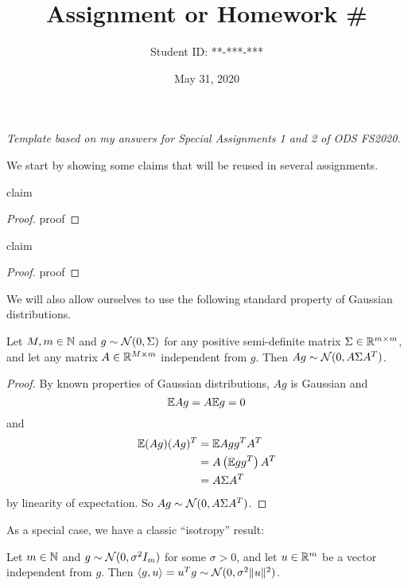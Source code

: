 \documentclass{article}
\title{Assignment or Homework \#}
\date{May 31, 2020}
\author{Student ID: **-***-***}
\numberwithin{equation}{subsection}
\begin{document}
\maketitle

\begin{center}
	\textit{Template based on my answers for Special Assignments 1 and 2 of ODS FS2020.}
\end{center}

We start by showing some claims that will be reused in several assignments.

\begin{claim} \label{claim:dummy_claim}
	claim
\end{claim}

\begin{proof}
	proof
\end{proof}

\begin{claim} 
	claim
\end{claim}

\begin{proof}
	proof
\end{proof}

We will also allow ourselves to use the following standard property of Gaussian distributions.
\begin{fact}
	Let $M, m \in \mathbb{N}$ and $g \sim \mathcal{N}(0, \Sigma)$ for any positive semi-definite matrix $\Sigma \in \mathbb{R}^{m \times m}$, and let any matrix $A \in \mathbb{R}^{M \times m}$ independent from $g$.
	Then $A g \sim \mathcal{N}(0, A \Sigma A^T)$.
\end{fact}

\begin{proof}
    By known properties of Gaussian distributions, $A g$ is Gaussian and
    \begin{equation}
        \mathbb{E} A g = A \mathbb{E} g = 0
    \end{equation}
    and
    \begin{align}
        \mathbb{E} (A g) (A g)^T &= \mathbb{E} A g g^T A^T \\
        &= A \left( \mathbb{E} g g^T \right) A^T \\
        &= A \Sigma A^T
    \end{align}
    by linearity of expectation. So $A g \sim \mathcal{N}(0, A \Sigma A^T)$.
\end{proof}

As a special case, we have a classic ``isotropy'' result:
\begin{fact}
	Let $m \in \mathbb{N}$ and $g \sim \mathcal{N}(0, \sigma^2 I_m)$ for some $\sigma > 0$, and let $u \in \mathbb{R}^m$ be a vector independent from $g$. Then $\langle g, u \rangle = u^T g \sim \mathcal{N}(0, \sigma^2 \|u\|^2)$.
\end{fact}
\end{document}
